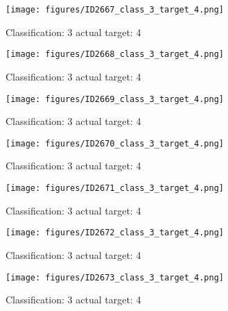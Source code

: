 \begin{figure}[h!]
\begin{center}
\texttt{[image: figures/ID2667\_class\_3\_target\_4.png]}
\end{center}
\caption{ Classification: 3 actual target: 4}
\label{fig:ID2667_class_3_target_4}
\end{figure}
\begin{figure}[h!]
\begin{center}
\texttt{[image: figures/ID2668\_class\_3\_target\_4.png]}
\end{center}
\caption{ Classification: 3 actual target: 4}
\label{fig:ID2668_class_3_target_4}
\end{figure}
\begin{figure}[h!]
\begin{center}
\texttt{[image: figures/ID2669\_class\_3\_target\_4.png]}
\end{center}
\caption{ Classification: 3 actual target: 4}
\label{fig:ID2669_class_3_target_4}
\end{figure}
\begin{figure}[h!]
\begin{center}
\texttt{[image: figures/ID2670\_class\_3\_target\_4.png]}
\end{center}
\caption{ Classification: 3 actual target: 4}
\label{fig:ID2670_class_3_target_4}
\end{figure}
\begin{figure}[h!]
\begin{center}
\texttt{[image: figures/ID2671\_class\_3\_target\_4.png]}
\end{center}
\caption{ Classification: 3 actual target: 4}
\label{fig:ID2671_class_3_target_4}
\end{figure}
\begin{figure}[h!]
\begin{center}
\texttt{[image: figures/ID2672\_class\_3\_target\_4.png]}
\end{center}
\caption{ Classification: 3 actual target: 4}
\label{fig:ID2672_class_3_target_4}
\end{figure}
\begin{figure}[h!]
\begin{center}
\texttt{[image: figures/ID2673\_class\_3\_target\_4.png]}
\end{center}
\caption{ Classification: 3 actual target: 4}
\label{fig:ID2673_class_3_target_4}
\end{figure}

